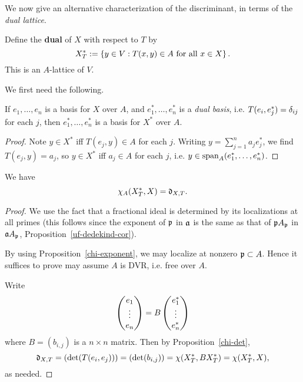 We now give an alternative characterization of the discriminant, in terms of the {\it dual lattice}.
\begin{df}
Define the \textbf{dual} of $X$ with respect to $T$ by
\[
X_T^*:=\left\{{y\in V}:{T(x,y)\in A\text{ for all }x\in X}\right\}.
\]
This is an $A$-lattice of $V$.
\end{df}
We first need the following.
\begin{pr}
If $e_1,\ldots, e_n$ is a basis for $X$ over $A$, and $e_1^*,\ldots, e_n^*$ is a {\it dual basis}, i.e. $T(e_i,e_j^*)=\delta_{ij}$ for each $j$, then $e_1^*,\ldots, e_n^*$ is a basis for $X^*$ over $A$.
\end{pr}
\begin{proof}
Note $y\in X^*$ iff $T(e_j,y)\in A$ for each $j$. Writing $y=\sum_{j=1}^n a_je_j^*$, we find $T(e_j,y)=a_j$, so $y\in X^*$ iff $a_j\in A$ for each $j$, i.e. $y\in \operatorname{span}_A(e_1^*,\ldots ,e_n^*)$.
\end{proof}
\begin{pr}
We have
\[
\chi_A(X_T^*,X)=\mathfrak d_{X,T}.
\]
\end{pr}
\begin{proof}
We use the fact that a fractional ideal is determined by its localizations at all primes (this follows since the exponent of $\mathfrak{p}$ in $\mathfrak{a}$ is the same as that of $\mathfrak{p} A_{\mathfrak{p}}$ in $\mathfrak{a} A_{\mathfrak{p}}$, Proposition~\ref{uf-dedekind-cor}).

By using Proposition~\ref{chi-exponent}, we may localize at nonzero $\mathfrak{p}\subset A$. Hence it suffices to prove may assume $A$ is DVR, i.e. free over $A$.

Write
\[
\begin{pmatrix} {e_1}\\ {\vdots}\\ {e_n} \end{pmatrix}
=
B
\begin{pmatrix} {e_1^*}\\ {\vdots}\\ {e_n^*} \end{pmatrix}
\]
where $B=(b_{i,j})$ is a $n\times n$ matrix.
Then by Proposition~\ref{chi-det},
\[
\mathfrak d_{X,T}=(\det(T(e_i,e_j)))=(\det(b_{i,j}))=\chi(X_T^*, BX_T^*)=\chi(X_T^*,X),
\]
as needed.
\end{proof}
